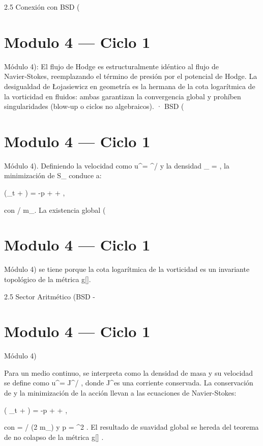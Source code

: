 \documentclass[12pt,twoside]{book}
\begin{document}
2.5 Conexión con BSD (

\chapter{Modulo 4 — Ciclo 1}
Módulo 4): El flujo de Hodge es estructuralmente idéntico al flujo de Navier‑Stokes, reemplazando el término de presión por el potencial de Hodge. La desigualdad de Łojasiewicz en geometría es la hermana de la cota logarítmica de la vorticidad en fluidos: ambas garantizan la convergencia global y prohíben singularidades (blow‑up o ciclos no algebraicos).
· BSD (

\chapter{Modulo 4 — Ciclo 1}
Módulo 4).
Definiendo la velocidad como u^\mu = \partial^\mu \phi / \sqrt{\partial_\alpha \phi \partial^\alpha \phi} y la densidad \rho_{} = \rho, la minimización de S_{} conduce a:

\rho (\partial_t  + \cdot\nabla {}) = -\nabla p + \nu \Delta {} + ,

con \nu \propto \hbar / m_{}. La existencia global (

\chapter{Modulo 4 — Ciclo 1}
Módulo 4) se tiene porque la cota logarítmica de la vorticidad es un invariante topológico de la métrica g[\rho].

2.5 Sector Aritmético (BSD - 

\chapter{Modulo 4 — Ciclo 1}
Módulo 4)

Para un medio continuo,  \rho  se interpreta como la densidad de masa y su velocidad se define como  u^\mu = J^\mu / \rho , donde  J^\mu  es una corriente conservada. La conservación de  \rho  y la minimización de la acción llevan a las ecuaciones de Navier-Stokes:

\rho \left( \partial_t  + \cdot\nabla {} \right) = -\nabla p + \nu \Delta {} + ,

con  \nu = \hbar / (2 m_{})  y  p = \kappa \rho^2 . El resultado de suavidad global se hereda del teorema de no colapso de la métrica  g[\rho] .
\end{document}
